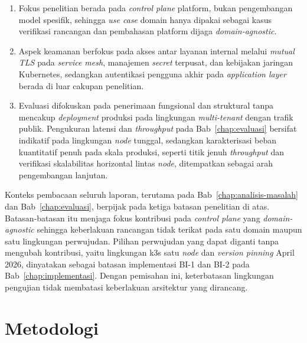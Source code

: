 \vspace{0.5em}
\begin{enumerate}
    \item Fokus penelitian berada pada \textit{control plane} platform, bukan pengembangan model spesifik, sehingga \textit{use case} domain hanya dipakai sebagai kasus verifikasi rancangan dan pembahasan platform dijaga \textit{domain-agnostic}.

    \item Aspek keamanan berfokus pada akses antar layanan internal melalui \textit{mutual TLS} pada \textit{service mesh}, manajemen \textit{secret} terpusat, dan kebijakan jaringan Kubernetes, sedangkan autentikasi pengguna akhir pada \textit{application layer} berada di luar cakupan penelitian.

    \item Evaluasi difokuskan pada penerimaan fungsional dan struktural tanpa mencakup \textit{deployment} produksi pada lingkungan \textit{multi-tenant} dengan trafik publik. Pengukuran latensi dan \textit{throughput} pada Bab~\ref{chap:evaluasi} bersifat indikatif pada lingkungan \textit{node} tunggal, sedangkan karakterisasi beban kuantitatif penuh pada skala produksi, seperti titik jenuh \textit{throughput} dan verifikasi skalabilitas horizontal lintas \textit{node}, ditempatkan sebagai arah pengembangan lanjutan.
\end{enumerate}

Konteks pembacaan seluruh laporan, terutama pada Bab~\ref{chap:analisis-masalah} dan Bab~\ref{chap:evaluasi}, berpijak pada ketiga batasan penelitian di atas. Batasan-batasan itu menjaga fokus kontribusi pada \textit{control plane} yang \textit{domain-agnostic} sehingga keberlakuan rancangan tidak terikat pada satu domain maupun satu lingkungan perwujudan. Pilihan perwujudan yang dapat diganti tanpa mengubah kontribusi, yaitu lingkungan k3s satu \textit{node} dan \textit{version pinning} April 2026, dinyatakan sebagai batasan implementasi BI-1 dan BI-2 pada Bab~\ref{chap:implementasi}. Dengan pemisahan ini, keterbatasan lingkungan pengujian tidak membatasi keberlakuan arsitektur yang dirancang.

\section{Metodologi}
\label{sec:metodologi}

